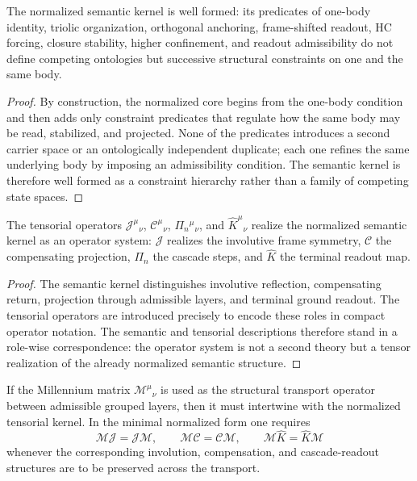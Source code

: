 \begin{lemma}
\label{lem:semantic-kernel-well-formedness-lemma}
The normalized semantic kernel is well formed: its predicates of one-body
identity, triolic organization, orthogonal anchoring, frame-shifted readout,
HC forcing, closure stability, higher confinement, and readout admissibility do
not define competing ontologies but successive structural constraints on one and
the same body.
\end{lemma}

\begin{proof}
By construction, the normalized core begins from the one-body condition and then
adds only constraint predicates that regulate how the same body may be read,
stabilized, and projected. None of the predicates introduces a second carrier
space or an ontologically independent duplicate; each one refines the same
underlying body by imposing an admissibility condition. The semantic kernel is
therefore well formed as a constraint hierarchy rather than a family of
competing state spaces.
\end{proof}

\begin{lemma}
\label{lem:tensor-realization-lemma}
The tensorial operators $\mathcal J^\mu{}_{\nu}$, $\mathcal C^\mu{}_{\nu}$,
$\Pi_n{}^\mu{}_{\nu}$, and $\hat K^\mu{}_{\nu}$ realize the normalized semantic
kernel as an operator system: $\mathcal J$ realizes the involutive frame
symmetry, $\mathcal C$ the compensating projection, $\Pi_n$ the cascade steps,
and $\hat K$ the terminal readout map.
\end{lemma}

\begin{proof}
The semantic kernel distinguishes involutive reflection, compensating return,
projection through admissible layers, and terminal ground readout. The tensorial
operators are introduced precisely to encode these roles in compact operator
notation. The semantic and tensorial descriptions therefore stand in a role-wise
correspondence: the operator system is not a second theory but a tensor
realization of the already normalized semantic structure.
\end{proof}

\begin{lemma}
\label{lem:millennium-intertwining-lemma}
If the Millennium matrix $\mathcal M^\mu{}_{\nu}$ is used as the structural
transport operator between admissible grouped layers, then it must intertwine
with the normalized tensorial kernel. In the minimal normalized form one
requires
\[
\mathcal M\mathcal J=\mathcal J\mathcal M,
\qquad
\mathcal M\mathcal C=\mathcal C\mathcal M,
\qquad
\mathcal M\hat K=\hat K\mathcal M
\]
whenever the corresponding involution, compensation, and cascade-readout
structures are to be preserved across the transport.
\end{lemma}

